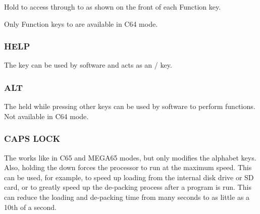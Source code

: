 Hold  to access  through to  as shown on the front of each Function key.

Only Function keys  to  are available in C64 mode.

\subsubsection{HELP}

The  key can be used by software and acts as an  /  key.

\subsubsection{ALT}

The  held while pressing other keys can be used by software to perform functions. Not available in C64 mode.

\subsubsection{CAPS LOCK}

The  works like  in C65 and MEGA65 modes, but only modifies the alphabet keys.
Also, holding the  down forces the processor to run at the maximum speed. This can be used, for example,
to speed up loading from the internal disk drive or SD card, or to greatly speed up the de-packing process after a program is run.
This can reduce the loading and de-packing time from many seconds to as little as a 10th of a second.
